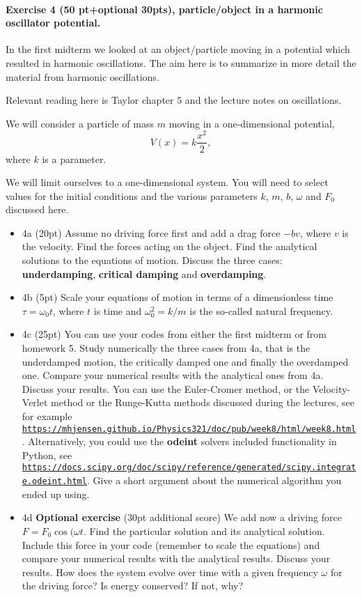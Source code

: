 \documentclass[%
oneside,                 %
final,                   %
10pt]{article}
\begin{document}
\noindent
\paragraph{Exercise 4 (50 pt+optional 30pts), particle/object in a harmonic oscillator  potential.}
In the first midterm we looked at an
object/particle moving in a potential which resulted in harmonic
oscillations.  The aim here is to summarize in more detail the
material from harmonic oscillations.

Relevant reading here is Taylor chapter 5 and the lecture notes on oscillations. 

We will consider a particle of mass $m$ moving in a one-dimensional potential,
\[
V(x)=k\frac{x^2}{2},
\]
where $k$ is a parameter.

We will limit ourselves to a one-dimensional system. You will need to select values for the initial conditions and the various parameters $k$, $m$, $b$, $\omega$ and $F_0$ discussed here.

\begin{itemize}
\item 4a (20pt)  Assume no driving force first and add a drag force $-bv$, where $v$ is the velocity. Find the forces acting on the object. Find the analytical solutions to the equations of motion. Discuss the three cases: \textbf{underdamping}, \textbf{critical damping} and \textbf{overdamping}.

\item 4b (5pt) Scale your equations of motion in terms of a dimensionless time $\tau = \omega_0 t$, where $t$ is time and $\omega_0^2=k/m$ is the so-called natural frequency. 

\item 4c (25pt) You can use your codes from either the first midterm or from homework 5.  Study numerically the three cases from 4a, that is the underdamped motion, the critically damped one and finally the overdamped one. Compare your numerical results with the analytical ones from 4a. Discuss your results. You can use the Euler-Cromer method, or the Velocity-Verlet method or the Runge-Kutta methods discussed during the lectures, see for example \href{{https://mhjensen.github.io/Physics321/doc/pub/week8/html/week8.html}}{\nolinkurl{https://mhjensen.github.io/Physics321/doc/pub/week8/html/week8.html}}. Alternatively, you could use the \textbf{odeint} solvers included functionality in Python, see \href{{https://docs.scipy.org/doc/scipy/reference/generated/scipy.integrate.odeint.html}}{\nolinkurl{https://docs.scipy.org/doc/scipy/reference/generated/scipy.integrate.odeint.html}}. Give a short argument about the numerical algorithm you ended up using.  

\item 4d \textbf{Optional exercise} (30pt additional score) We add now a driving force $F=F_0\cos{(\omega t}$. Find the particular solution and its analytical solution. Include this force in your code (remember to scale the equations) and compare your numerical results with the analytical results. Discuss your results. How does the system evolve over time with a given frequency $\omega$ for the driving force?   Is energy conserved? If not, why? 
\end{itemize}
\end{document}
